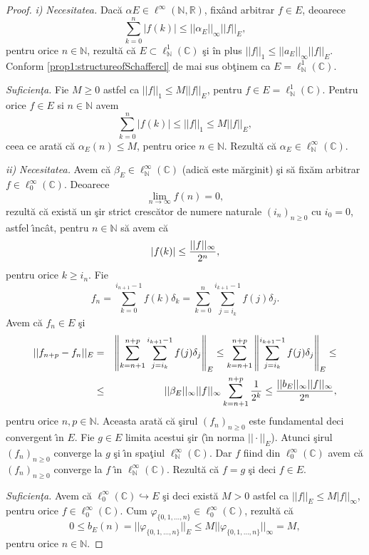 \documentclass[ a4paper, 12pt]{report}
\newcommand{\N}{\mathbb{N}}
\theoremstyle{definition}
\theoremstyle{remark}
\numberwithin{equation}{section}
\begin{document}
\begin{proof}{\it i)} {\it Necesitatea.}  Dac\u a $\alpha E \in
\ell^\infty(\mathbb{N}, \mathbb{R})$, fix\^and arbitrar $f \in E$,
deoarece
$$\sum\limits_{k = 0}^n |f(k)| \leq ||\alpha_E||_\infty ||f||_E,$$
pentru orice $n \in \mathbb{N}$, rezult\u a c\u a $E \subset
\ell^1_\N(\mathbb{C})$ \c si \^ in plus $||f||_1 \leq
||a_E||_\infty ||f||_E$. Conform \ref{prop1:structureofSchaffercl} de mai sus
ob\c tinem ca $E = \ell^1_\N (\mathbb{C})$.

{\it Suficien\c ta.} Fie $M \geq 0$ astfel ca $||f||_1 \leq M
||f||_E$, pentru $f \in E =  \ell^1_\N(\mathbb{C})$.
Pentru orice $f \in E$ si $n\in \mathbb{N}$ avem
$$\sum\limits_{k = 0}^n |f(k)| \leq ||f||_1 \leq M ||f||_E, $$
ceea ce arat\u a c\u a $\alpha_E(n) \leq M$, pentru orice $n \in
\mathbb{N}$. Rezult\u a c\u a $\alpha_E \in \ell^\infty_\N (\mathbb{C})$.

{\it ii)} {\it Necesitatea.} Avem c\u a $\beta_E \in \ell^\infty_\N
(\mathbb{C})$ (adic\u a este m\u arginit) \c si s\u a fix\u am arbitrar $f \in
\ell^\infty_0 (\mathbb{C})$. Deoarece
$$\lim\limits_{n
\to \infty} f(n) = 0,$$ rezult\u a c\u a exist\u a un \c sir strict cresc\u ator de
numere naturale ${(i_n)}_{n \geq 0}$ cu $i_0 = 0$, astfel \^\i nc\^ at,
pentru $n \in \mathbb{N}$ s\u a avem c\u a
$$|f(k)| \leq \displaystyle\frac{||f||_\infty}{2^n},$$  pentru orice
 $k \geq i_n$. Fie
 $$f_n = \sum\limits_{k = 0}^{i_{n + 1} - 1}
f(k) \delta_k = \sum\limits_{k = 0}^n \sum\limits_{j = i_k}^{i_{k
+ 1} - 1} f(j) \delta_j.$$ Avem c\u a $f_n \in E$ \c si
\begin{eqnarray*}
||f_{n + p} - f_n||_E &=& \left\lVert\sum\limits_{k = n + 1}^{n + p}\sum\limits_{j = i_k}^{i_{k
+ 1} - 1} f(j) \delta_j\right\rVert_E \leq \sum\limits_{k = n + 1}^{n + p}\left\lVert\sum\limits_{j = i_k}^{i_{k
+ 1} - 1} f(j) \delta_j\right\rVert_E \leq \\
&\leq&||\beta_E||_\infty ||f||_\infty \sum\limits_{k = n + 1}^{n + p}\displaystyle\frac{1}{2^k} \leq \displaystyle\frac{||b_E||_\infty ||f||_\infty}{2^n},
\end{eqnarray*}
pentru orice $n, p \in \mathbb{N}$. Aceasta arat\u a c\u a \c sirul
$(f_n)_{n \geq 0}$ este fundamental deci convergent \^\i n $E$. Fie $g
\in E$ limita acestui \c sir (\^\i n norma $||\cdot||_E$). Atunci \c sirul
$(f_n)_{n \geq 0}$ converge la $g$ \c si \^\i n spa\c tiul $\ell^\infty_\N
(\mathbb{C})$. Dar $f$ fiind din $\ell^\infty_0
(\mathbb{C})$ avem c\u a $(f_n)_{n \geq 0}$ converge la
$f$ \^\i n $\ell^\infty_\N (\mathbb{C})$. Rezult\u a c\u a $f = g$
\c si deci $f\in E$.

{\it Suficien\c ta.} Avem c\u a $\ell^\infty_0(\mathbb{C})
\hookrightarrow E$ \c si deci exist\u a $M > 0$ astfel ca $||f||_E \leq
M|f||_\infty$, pentru orice $f \in \ell^\infty_0(\mathbb{C})$. Cum $\varphi_{\{ 0, 1, \ldots , n\}} \in
\ell^\infty_0(\mathbb{C})$, rezult\u a c\u a
$$0 \leq b_E(n) = ||\varphi_{\{ 0, 1, \ldots , n\}}||_E \leq M ||\varphi_{\{ 0, 1, \ldots ,
n\}}||_\infty = M,$$ pentru orice $n \in \mathbb{N}$.
\end{proof}
\end{document}
